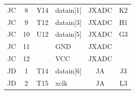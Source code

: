 \documentclass[../main.tex]{subfiles}%
\begin{document}
\begin{table}[h]
\begin{tabular}{ccclcc}
JC                                             & 8                                        & Y14                                      & datain{[}1{]}                          & JXADC                                                                                    & K2                                                                                    \\
\rowcolor[HTML]{C0E6F5} 
JC                                             & 9                                        & T12                                      & datain{[}3{]}                          & JXADC                                                                                    & H1                                                                                    \\
JC                                             & 10                                       & U12                                      & datain{[}5{]}                          & JXADC                                                                                    & G3                                                                                    \\
\rowcolor[HTML]{C0E6F5} 
JC                                             & 11                                       &                                          & GND                                    & JXADC                                                                                    & \multicolumn{1}{l}{\cellcolor[HTML]{C0E6F5}}                                          \\
JC                                             & 12                                       &                                          & VCC                                    & JXADC                                                                                    & \multicolumn{1}{l}{}                                                                  \\
\rowcolor[HTML]{C0E6F5} 
JD                                             & 1                                        & T14                                      & datain{[}6{]}                          & JA                                                                                       & J3                                                                                    \\
JD                                             & 2                                        & T15                                      & xclk                                   & JA                                                                                       & L3                                                                                    \\

\end{tabular}
\end{table}
\end{document}
